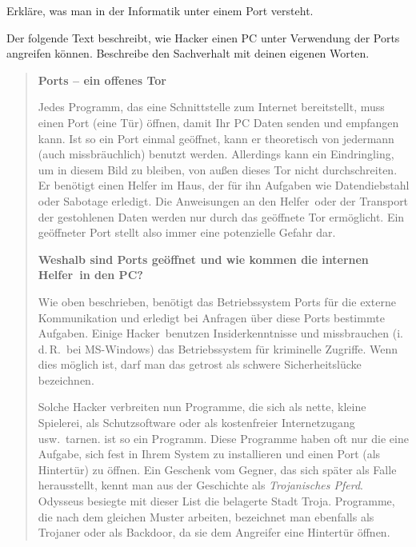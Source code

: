 \begin{compactenum}[a)]
\item Erkläre, was man in der Informatik unter einem Port versteht.

\item Der folgende Text beschreibt, wie Hacker einen PC unter Verwendung der
Ports angreifen können. Beschreibe den Sachverhalt mit deinen eigenen Worten.

\begin{quotation}
\noindent \textbf{Ports -- ein offenes Tor}

\noindent
Jedes Programm, das eine Schnittstelle zum Internet bereitstellt, muss einen
Port (eine Tür) öffnen, damit Ihr PC Daten senden und empfangen kann. Ist so
ein Port einmal geöffnet, kann er theoretisch von jedermann (auch
missbräuchlich) benutzt werden. Allerdings kann ein Eindringling, um in diesem
Bild zu bleiben, von außen dieses Tor nicht durchschreiten. Er benötigt einen
\glqq Helfer im Haus\grqq , der für ihn Aufgaben wie Datendiebstahl oder
Sabotage erledigt. Die Anweisungen an den \glqq Helfer\grqq\ oder der Transport
der gestohlenen Daten werden nur durch das geöffnete Tor ermöglicht. Ein
geöffneter Port stellt also immer eine potenzielle Gefahr dar.

\noindent
\textbf{Weshalb sind Ports geöffnet und wie kommen die internen \glqq
Helfer\grqq\ in den PC?}

\noindent
Wie oben beschrieben, benötigt das Betriebssystem Ports für die externe
Kommunikation und erledigt bei Anfragen über diese Ports bestimmte Aufgaben.
Einige \glqq Hacker\grqq\ benutzen Insiderkenntnisse und missbrauchen (i.\,d.\,R.\
bei MS-Windows) das Betriebssystem für kriminelle Zugriffe. Wenn dies möglich
ist, darf man das getrost als schwere Sicherheitslücke bezeichnen.

\noindent
Solche Hacker verbreiten nun Programme, die sich als nette, kleine Spielerei,
als Schutzsoftware oder als kostenfreier Internetzugang usw.\ tarnen.
\myFile{AOL4FREE.EXE} ist so ein Programm. Diese Programme haben oft nur die
eine Aufgabe, sich fest in Ihrem System zu installieren und einen Port (als
Hintertür) zu öffnen. Ein Geschenk vom Gegner, das sich später als Falle
herausstellt, kennt man aus der Geschichte als \emph{Trojanisches Pferd}.
Odysseus besiegte mit dieser List die belagerte Stadt Troja. Programme, die
nach dem gleichen Muster arbeiten, bezeichnet man ebenfalls als Trojaner oder
als \glqq Backdoor\grqq , da sie dem Angreifer eine Hintertür öffnen.


\end{quotation}
\end{compactenum}
